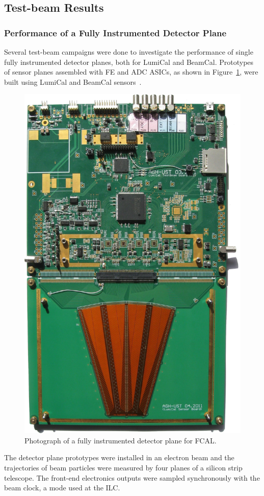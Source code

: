 \subsection{Test-beam Results}

\subsubsection{Performance of a Fully Instrumented  Detector Plane}

Several test-beam campaigns were done to investigate the performance of single fully instrumented detector planes,
both for LumiCal and BeamCal.
Prototypes of sensor planes assembled with FE and ADC ASICs,
as shown in Figure~\ref{fig:fcal_lumical_module_photo},
were built using LumiCal and BeamCal sensors~\cite{1748-0221-7-01-T01004}.
\begin{figure}[hbp]
\centering
\includegraphics[width=0.35\columnwidth,angle=90]{Calorimeter/FCAL/figs/tb3_complete_module}
\caption{Photograph of a fully instrumented detector plane for FCAL.}
\label{fig:fcal_lumical_module_photo}
\end{figure}
The detector plane prototypes were installed in an electron beam and
the trajectories of beam particles were measured by four planes of a silicon strip
telescope.
The front-end electronics outputs were sampled synchronously with the
beam clock, a mode used at the ILC.
